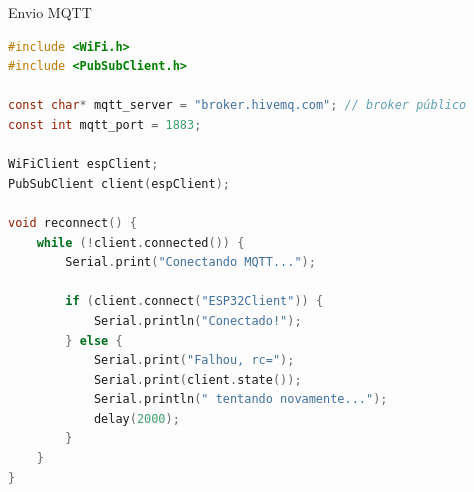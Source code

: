 \begin{frame}[fragile]{Envio MQTT}
\begin{lstlisting}[language=C, basicstyle=\tiny\ttfamily]
#include <WiFi.h>
#include <PubSubClient.h>

const char* mqtt_server = "broker.hivemq.com"; // broker público
const int mqtt_port = 1883;

WiFiClient espClient;
PubSubClient client(espClient);

void reconnect() {
    while (!client.connected()) {
        Serial.print("Conectando MQTT...");

        if (client.connect("ESP32Client")) {
            Serial.println("Conectado!");
        } else {
            Serial.print("Falhou, rc=");
            Serial.print(client.state());
            Serial.println(" tentando novamente...");
            delay(2000);
        }
    }
}
\end{lstlisting}

\end{frame}
        
        